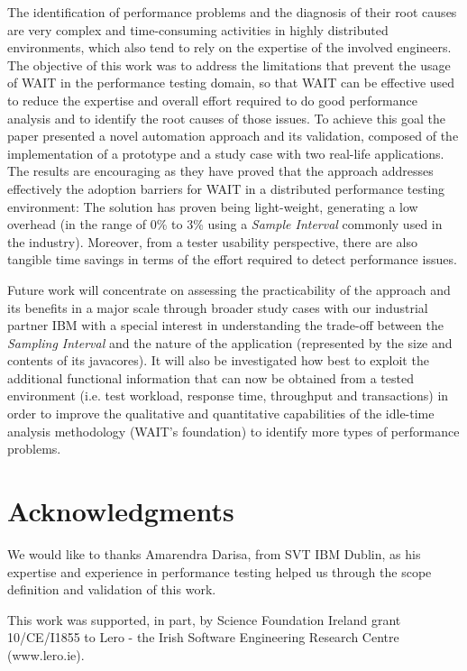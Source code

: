 \documentclass[runningheads,a4paper]{llncs}
\begin{document}
The identification of performance problems and the diagnosis of their root
causes are very complex and time-consuming activities in highly distributed
environments, which also tend to rely on the expertise of the involved
engineers. The objective of this work was to address the limitations that
prevent the usage of WAIT in the performance testing domain, so that WAIT can be
effective used to reduce the expertise and overall effort required to do
good performance analysis and to identify the root causes of those issues.
To achieve this goal the paper presented a novel automation approach and its
validation, composed of the implementation of a prototype and a study
case with two real-life applications. The results are encouraging as they have
proved that the approach addresses effectively the adoption barriers for WAIT in 
a distributed performance testing environment: The solution has proven being
light-weight, generating a low overhead (in the range of 0\% to 3\% using a
\emph{Sample Interval} commonly used in the industry). Moreover, from a tester
usability perspective, there are also tangible time savings in terms of the effort required to detect performance issues.

Future work will concentrate on assessing the practicability of the
approach and its benefits in a major scale through broader study cases with our
industrial partner IBM with a special interest in understanding the trade-off
between the \emph{Sampling Interval} and the nature of the application
(represented by the size and contents of its javacores). It will also be
investigated how best to exploit the additional functional information that can
now be obtained from a tested environment (i.e. test workload, response time,
throughput and transactions) in order to improve the qualitative and
quantitative capabilities of the idle-time analysis methodology (WAIT's
foundation) to identify more types of performance problems.


\section*{Acknowledgments}

We would like to thanks Amarendra Darisa, from SVT IBM Dublin, as his expertise
and experience in performance testing helped us through the scope definition and validation of this work.

This work was supported, in part, by Science Foundation Ireland grant 10/CE/I1855 to Lero - the Irish Software Engineering Research Centre (www.lero.ie).




\end{document}
